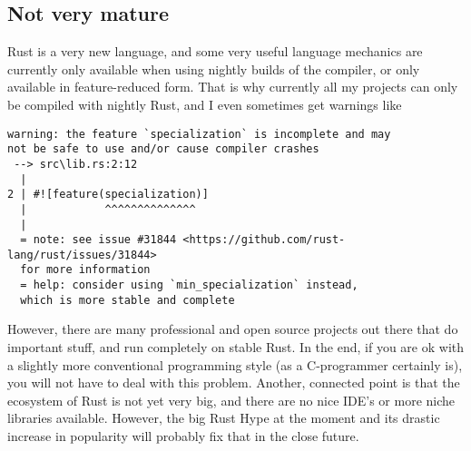 \documentclass{scrartcl}
\begin{document}
\subsection{Not very mature}
Rust is a very new language, and some very useful language mechanics are currently only available when using nightly builds of the compiler, or only available in feature-reduced form.
That is why currently all my projects can only be compiled with nightly Rust, and I even sometimes get warnings like
\begin{lstlisting}
warning: the feature `specialization` is incomplete and may 
not be safe to use and/or cause compiler crashes
 --> src\lib.rs:2:12
  |
2 | #![feature(specialization)]
  |            ^^^^^^^^^^^^^^
  |
  = note: see issue #31844 <https://github.com/rust-lang/rust/issues/31844> 
  for more information
  = help: consider using `min_specialization` instead, 
  which is more stable and complete
\end{lstlisting}
However, there are many professional and open source projects out there that do important stuff, and run completely on stable Rust.
In the end, if you are ok with a slightly more conventional programming style (as a C-programmer certainly is), you will not have to deal with this problem.
Another, connected point is that the ecosystem of Rust is not yet very big, and there are no nice IDE's or more niche libraries available.
However, the big Rust Hype at the moment and its drastic increase in popularity will probably fix that in the close future.
\end{document}
